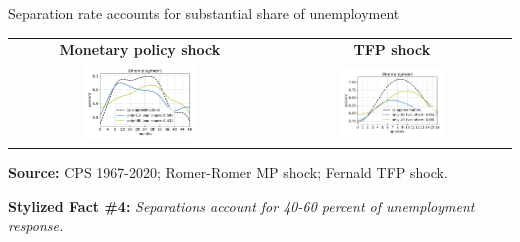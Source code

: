 \documentclass[aspectratio=169]{beamer}
\begin{document}
\begin{frame}{Separation rate accounts for substantial share of unemployment}

\begin{center}

\begin{tabular}{cc}
\textbf{Monetary policy shock} & \textbf{TFP shock}\tabularnewline
\textbf{\small{}\includegraphics[width=0.45\textwidth]{results/monetary_shock_decomposition}} & \textbf{\small{}\includegraphics[width=0.45\textwidth]{results/technology_shock_decomposition}}\tabularnewline
\end{tabular}

\textbf{\footnotesize{}Source: }{\footnotesize{}CPS 1967-2020; Romer-Romer
MP shock; Fernald TFP shock}.\vspace{3mm}

\end{center}
\textbf{Stylized Fact \#4:} \emph{Separations account for 40-60 percent of unemployment response.}
\hyperlink{slide:calibration}{}

\end{frame}
\end{document}
